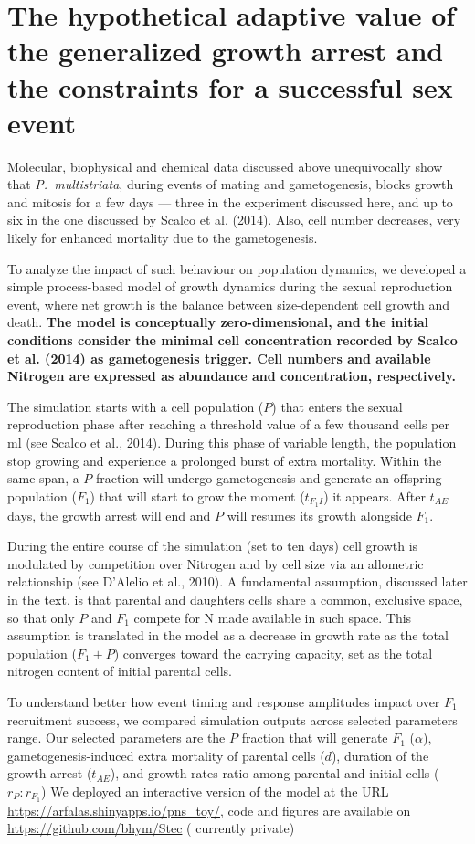 \documentclass[a4paper,oneside]{article}
\begin{document}
  \section*{The hypothetical adaptive value of the generalized growth arrest and the constraints for a successful sex event}
    Molecular, biophysical and chemical data discussed above unequivocally show that \textit{P.~multistriata}, during events of mating and gametogenesis, blocks growth and mitosis for a few days --- three in the experiment discussed here, and up to six in the one discussed by Scalco et al. (2014).
    Also, cell number decreases, very likely for enhanced mortality due to the gametogenesis.

    To analyze the impact of such behaviour on population dynamics, we developed a simple process-based model of growth dynamics during the sexual reproduction event, where net growth is the balance between size-dependent cell growth and death.
    \textbf{The model is conceptually zero-dimensional, and the initial conditions consider the minimal cell concentration recorded by Scalco et al. (2014) as gametogenesis trigger.
    Cell numbers and available Nitrogen are expressed as abundance and concentration, respectively.}
    
    The simulation starts with a cell population ($P$) that enters the sexual reproduction phase after reaching a threshold value of a few thousand cells per ml (see Scalco et al., 2014).
    During this phase of variable length, the population stop growing and experience a prolonged burst of extra mortality.
    Within the same span, a $P$ fraction will undergo gametogenesis and generate an offspring population ($F_{1}$) that will start to grow the moment ($t_{F_{1}I}$) it appears.
    After $t_{AE}$ days, the growth arrest will end and $P$ will resumes its growth alongside $F_{1}$.

    During the entire course of the simulation (set to ten days) cell growth is modulated by competition over Nitrogen and by cell size via an allometric relationship (see D'Alelio et al., 2010).
    A fundamental assumption, discussed later in the text, is that parental and daughters cells share a common, exclusive space, so that only $P$ and $F_{1}$ compete for N made available in such space.
    This assumption is translated in the model as a decrease in growth rate as the total population ($F_{1} + P$) converges toward the carrying capacity, set as the total nitrogen content of initial parental cells.
    
    To understand better how event timing and response amplitudes impact over $F_1$ recruitment success, we compared simulation outputs across selected parameters range.
    Our selected parameters are the $P$ fraction that will generate $F_{1}$ ($\alpha$), gametogenesis-induced extra mortality of parental cells ($d$), duration of the growth arrest ($t_{AE}$), and growth rates ratio among parental and initial cells ($r_{P}:r_{F_{1}}$)
    We deployed an interactive version of the model at the URL \url{https://arfalas.shinyapps.io/pns_toy/}, code and figures are available on \url{https://github.com/bhym/Stec} ({\color{red} currently private})
%
\end{document}
